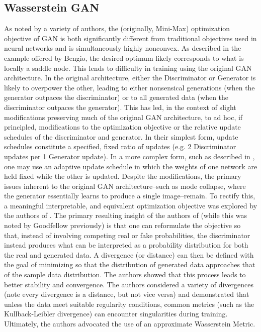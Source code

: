 \documentclass{article}
\begin{document}
\subsection{Wasserstein GAN }\label{wgan}
	As noted by a variety of authors, the (originally, Mini-Max) optimization objective of GAN is both significantly different from traditional objectives used in neural networks and is simultaneously highly nonconvex.   As described in the example offered by Bengio, the desired optimum likely corresponds to what is locally a saddle node.  This lends to difficulty in training using the original GAN architecture.  In the original architecture, either the Discriminator or Generator is likely to overpower the other, leading to either nonsensical generations (when the generator outpaces the discriminator) or to all generated data (when the discriminator outpaces the generator).  This has led, in the context of slight modifications preserving much of the original GAN architecture, to ad hoc, if principled, modifications to the optimization objective or the relative update schedules of the discriminator and generator.
       In their simplest form, update schedules constitute a specified, fixed ratio of updates (e.g. 2 Discriminator updates per 1 Generator update).  In a more complex form, such as described in \cite{Radford2015UnsupervisedNetworks}, one may use an adaptive update schedule in which the weights of one network are held fixed while the other is updated.  
    Despite the modifications, the primary issues inherent to the original GAN architecture--such as mode collapse, where the generator essentially learns to produce a single image--remain.  To rectify this, a meaningful interpretable, and equivalent optimization objective was explored by the authors of \cite{Arjovsky2017WassersteinGAN}.  The primary resulting insight of the authors of \cite{Arjovsky2017WassersteinGAN} (while this was noted by Goodfellow previously) is that one can reformulate the objective so that, instead of involving competing real or fake probabilities, the discriminator instead produces what can be interpreted as a probability distribution for both the real and generated data.  A divergence (or distance) can then be defined with the goal of minimizing so that the distribution of generated data approaches that of the sample data distribution.  The authors showed that this process leads to better stability and convergence.
    The authors considered a variety of divergences (note every divergence is a distance, but not vice versa) and demonstrated that unless the data meet suitable regularity conditions, common metrics (such as the Kullback-Leibler divergence) can encounter singularities during training. Ultimately, the authors advocated the use of an approximate Wasserstein Metric.
\end{document}
